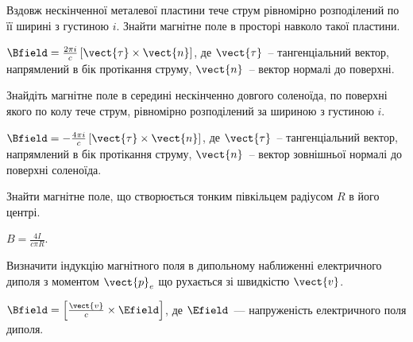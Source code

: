 \begin{problem}
    Вздовж нескінченної металевої пластини тече струм рівномірно розподілений по її ширині з густиною $i$. Знайти магнітне поле в просторі навколо такої пластини.
\begin{solution}
	$\Bfield = \frac{2\pi i }{c} \left[ \vect{\tau}\times\vect{n}\right] $, де $\vect{\tau}$~-- тангенціальний вектор, напрямлений в бік протікання струму, $\vect{n}$~-- вектор нормалі до поверхні.
\end{solution}
\end{problem}

\begin{problem}
    Знайдіть магнітне поле в середині нескінченно довгого соленоїда, по поверхні якого по колу тече струм, рівномірно розподілений за шириною з густиною $i$.
	\begin{solution}
			$\Bfield = - \frac{4\pi i }{c} \left[ \vect{\tau}\times\vect{n}\right] $, де $\vect{\tau}$~-- тангенціальний вектор, напрямлений в бік протікання струму, $\vect{n}$~-- вектор зовнішньої нормалі до поверхні соленоїда.
	\end{solution}
\end{problem}



\begin{problem}
    Знайти магнітне поле, що створюється тонким півкільцем радіусом $R$  в його центрі.
\begin{solution}
	$B = \frac{4I}{c\pi R}$.
\end{solution}
\end{problem}



\begin{problem}\label{Bfield_of_electric_dipole}
    Визначити індукцію магнітного поля в дипольному наближенні електричного диполя з моментом $\vect{p}_e$ що рухається зі швидкістю $\vect{v}$.
\begin{solution}
	$\Bfield = \left[ \frac{\vect{v}}{c}\times\Efield\right]  $, де $\Efield$~--- напруженість електричного поля диполя.
\end{solution}
\end{problem}


